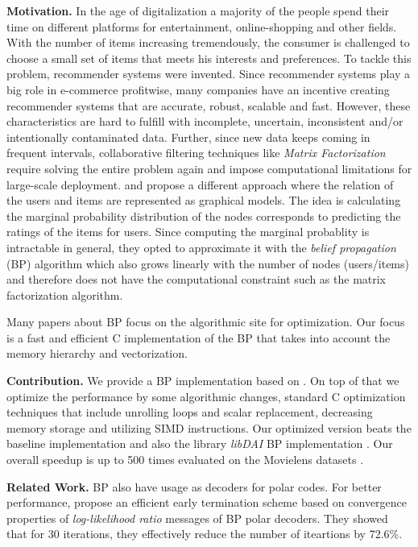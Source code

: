\documentclass[letterpaper]{article}
\newcommand{\mypar}[1]{{\bf #1.}}
\begin{document}
\mypar{Motivation}
In the age of digitalization a majority of the people spend their time on different platforms for entertainment, online-shopping and other fields. With the number of items increasing tremendously, the consumer is challenged to choose a small set of items that meets his interests and preferences. To tackle this problem, recommender systems were invented. Since recommender systems play a big role in e-commerce profitwise, many companies have an incentive creating recommender systems that are accurate, robust, scalable and fast. However, these characteristics are hard to fulfill with incomplete, uncertain, inconsistent and/or intentionally contaminated data. Further, since new data keeps coming in frequent intervals, collaborative filtering techniques like \emph{Matrix Factorization} require solving the entire problem again and impose computational limitations for large-scale deployment. \citet{BPRS} and \citet{top-n-recommendation} propose a different approach where the relation of the users and items are represented as graphical models. The idea is calculating the marginal probability distribution of the nodes corresponds to predicting the ratings of the items for users. Since computing the marginal probablity is intractable in general, they opted to approximate it with the \emph{belief propagation} (BP) algorithm which also grows linearly with the number of nodes (users/items) and therefore does not have the computational constraint such as the matrix factorization algorithm.

Many papers about BP focus on the algorithmic site for optimization. Our focus is a fast and efficient C implementation of the BP that takes into account the memory hierarchy and vectorization.

\mypar{Contribution}
We provide a BP implementation based on \citet{top-n-recommendation}. On top of that we optimize the performance by some algorithmic changes, standard C optimization techniques that include unrolling loops and scalar replacement, decreasing memory storage and utilizing SIMD instructions. Our optimized version beats the baseline implementation and also the library \emph{libDAI} BP implementation \cite{libdai}. Our overall speedup is up to 500 times evaluated on the Movielens datasets \cite{movieLens}.

\mypar{Related Work}
BP also have usage as decoders for polar codes. For better performance, \citet{related1} propose an efficient early termination scheme based on convergence properties of \emph{log-likelihood ratio} messages of BP polar decoders. They showed that for 30 iterations, they effectively reduce the number of iteartions by 72.6\%.
\end{document}
